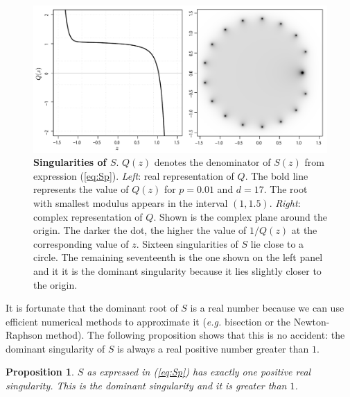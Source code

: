 \documentclass{article}
\newtheorem{proposition}{Proposition}
\begin{document}
\begin{figure}[h]
\centering
\includegraphics[scale=0.4]{singularityS.pdf}
\caption{\textbf{Singularities of $S$}. $Q(z)$ denotes the
denominator of $S(z)$ from expression (\ref{eq:Sp}). \textit{Left}: real
representation of $Q$. The bold line represents the value of $Q(z)$ for
$p=0.01$ and $d=17$. The root with smallest modulus appears in the
interval $(1, 1.5)$. \textit{Right}: complex representation of $Q$. Shown
is the complex plane around the origin. The darker the dot, the higher the
value of $1/Q(z)$ at the corresponding value of $z$. Sixteen singularities
of $S$ lie close to a circle. The remaining seventeenth is the one shown
on the left panel and it it is the dominant singularity because it lies
slightly closer to the origin.}
\label{fig:plotQ}
\end{figure}

It is fortunate that the dominant root of $S$ is a real number because we
can use efficient numerical methods to approximate it (\textit{e.g.}
bisection or the Newton-Raphson method). The following proposition shows
that this is no accident: the dominant singularity of $S$ is always a real
positive number greater than $1$.

\begin{proposition}
\label{th:roots}
$S$ as expressed in (\ref{eq:Sp}) has exactly one positive real
singularity. This is the dominant singularity and it is greater than $1$.
\end{proposition}
\end{document}

